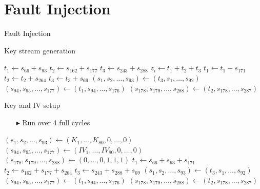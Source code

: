 \documentclass[10pt, compress]{beamer}
\begin{document}
\section{Fault Injection}

\begin{frame}{Fault Injection}
\begin{figure}

\end{figure}
\end{frame}

\begin{frame}{Key stream generation}
\begin{center}
\begin{minipage}{\textwidth}
\begin{algorithm}[H]
\begin{algorithmic}[1]
 
\State $t_1 \gets s_{66} + s_{93}$
\State $t_2 \gets s_{162} + s_{177}$
\State $t_3 \gets s_{243} + s_{288}$
\State
\State $z_i \gets t_1 + t_2 + t_3$
\State
\State $t_1 \gets t_1 + s_{171}$
\State $t_2 \gets t_2 + s_{264}$
\State $t_3 \gets t_3 + s_{69}$
\State
\State $(s_1,s_2,\dots,s_{93}) \gets (t_3,s_1,\dots,s_{92})$ 
\State $(s_{94},s_{95},\dots,s_{177}) \gets (t_1,s_{94},\dots,s_{176})$ 
\State $(s_{178},s_{179},\dots,s_{288}) \gets (t_2,s_{178},\dots,s_{287})$ 
\EndFor
\end{algorithmic}
\end{algorithm}
\end{minipage}
\end{center}
\end{frame}

\begin{frame}{Key and IV setup}
\begin{itemize}
\item[$\blacktriangleright$] Run over 4 full cycles
\end{itemize}
\begin{center}
\begin{minipage}{\textwidth}
\begin{algorithm}[H]
\begin{algorithmic}[1]
\State $(s_1,s_2,\dots,s_{93}) \gets (K_1,\dots,K_{80},0,\dots,0)$ 
\State $(s_{94},s_{95},\dots,s_{177}) \gets (IV_1,\dots,IV_{80},0,\dots,0)$ 
\State $(s_{178},s_{179},\dots,s_{288}) \gets (0,\dots,0,1,1,1)$ 
\State
{}
\State $t_1 \gets s_{66} + s_{93} + s_{171}$
\State $t_2 \gets s_{162} + s_{177} + s_{264}$
\State $t_3 \gets s_{243} + s_{288}+ s_{69}$
\State
\State $(s_1,s_2,\dots,s_{93}) \gets (t_3,s_1,\dots,s_{92})$ 
\State $(s_{94},s_{95},\dots,s_{177}) \gets (t_1,s_{94},\dots,s_{176})$ 
\State $(s_{178},s_{179},\dots,s_{288}) \gets (t_2,s_{178},\dots,s_{287})$ 
\EndFor
\end{algorithmic}
\end{algorithm}
\end{minipage}
\end{center}
\end{frame}
\end{document}
